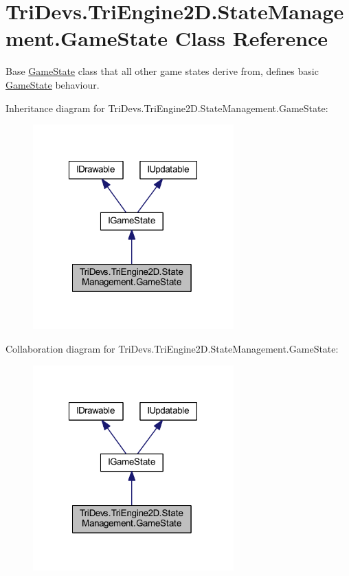 \hypertarget{class_tri_devs_1_1_tri_engine2_d_1_1_state_management_1_1_game_state}{\section{Tri\-Devs.\-Tri\-Engine2\-D.\-State\-Management.\-Game\-State Class Reference}
\label{class_tri_devs_1_1_tri_engine2_d_1_1_state_management_1_1_game_state}
}


Base \hyperlink{class_tri_devs_1_1_tri_engine2_d_1_1_state_management_1_1_game_state}{Game\-State} class that all other game states derive from, defines basic \hyperlink{class_tri_devs_1_1_tri_engine2_d_1_1_state_management_1_1_game_state}{Game\-State} behaviour.  




Inheritance diagram for Tri\-Devs.\-Tri\-Engine2\-D.\-State\-Management.\-Game\-State\-:
\nopagebreak
\begin{figure}[H]
\begin{center}
\leavevmode
\includegraphics[width=219pt]{class_tri_devs_1_1_tri_engine2_d_1_1_state_management_1_1_game_state__inherit__graph}
\end{center}
\end{figure}


Collaboration diagram for Tri\-Devs.\-Tri\-Engine2\-D.\-State\-Management.\-Game\-State\-:
\nopagebreak
\begin{figure}[H]
\begin{center}
\leavevmode
\includegraphics[width=219pt]{class_tri_devs_1_1_tri_engine2_d_1_1_state_management_1_1_game_state__coll__graph}
\end{center}
\end{figure}
